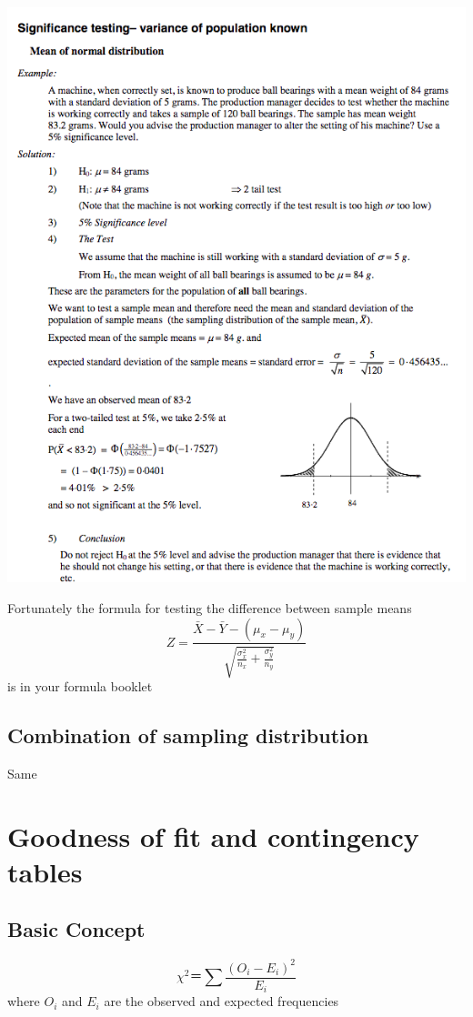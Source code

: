 \documentclass[a4paper]{article}
\begin{document}
\begin{eg}
\end{eg}
\begin{center}
	\includegraphics[scale=0.5]{img_S/18_eg2}
\end{center}

Fortunately the formula for testing the difference between sample means 
\[
	Z=\frac{\bar{X}-\bar{Y}-(\mu_x-\mu_y)}{\sqrt{\frac{\sigma_x^2}{n_x}+{\frac{\sigma_y^2}{n_y}}}}
\]
is in your formula booklet

\subsection{Combination of sampling distribution}
Same

\section{Goodness of fit and contingency tables}
\subsection{Basic Concept}
\begin{defi}
	\[
		\chi^2＝\sum\frac{(O_i-E_i)^2}{E_i}
	\]
where $O_i$ and $E_i$ are the observed and expected frequencies
\end{defi}
\end{document}
